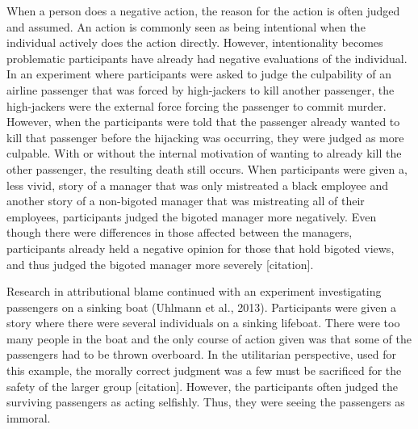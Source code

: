 \documentclass[
  donotrepeattitle,doc, 12pt, a4paper,floatsintext]{apa7}
\begin{document}
When a person does a negative action, the reason for the action is often judged and assumed. An action is commonly seen as being intentional when the individual actively does the action directly. However, intentionality becomes problematic participants have already had negative evaluations of the individual. In an experiment where participants were asked to judge the culpability of an airline passenger that was forced by high-jackers to kill another passenger, the high-jackers were the external force forcing the passenger to commit murder. However, when the participants were told that the passenger already wanted to kill that passenger before the hijacking was occurring, they were judged as more culpable. With or without the internal motivation of wanting to already kill the other passenger, the resulting death still occurs. When participants were given a, less vivid, story of a manager that was only mistreated a black employee and another story of a non-bigoted manager that was mistreating all of their employees, participants judged the bigoted manager more negatively. Even though there were differences in those affected between the managers, participants already held a negative opinion for those that hold bigoted views, and thus judged the bigoted manager more severely {[}citation{]}.

Research in attributional blame continued with an experiment investigating passengers on a sinking boat (Uhlmann et al., 2013). Participants were given a story where there were several individuals on a sinking lifeboat. There were too many people in the boat and the only course of action given was that some of the passengers had to be thrown overboard. In the utilitarian perspective, used for this example, the morally correct judgment was a few must be sacrificed for the safety of the larger group {[}citation{]}. However, the participants often judged the surviving passengers as acting selfishly. Thus, they were seeing the passengers as immoral.
\end{document}
